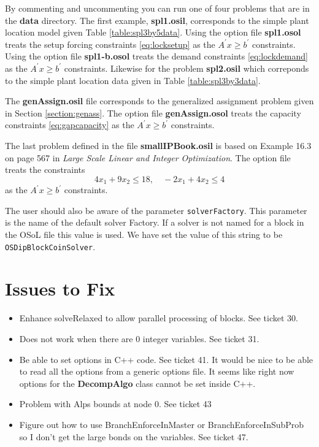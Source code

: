 \documentclass[11pt]{article}
\newcounter{Fig}
\begin{document}
By commenting and uncommenting you can run one of four problems that are in the
{\bf data} directory. The first example, {\bf spl1.osil}, corresponds to the
simple plant location model given Table \ref{table:spl3by5data}. Using the
option file {\bf spl1.osol} treats the setup forcing constraints
\ref{eq:locksetup} as the $A^{\prime} x \ge b^{\prime}$ constraints. Using the
option file {\bf spl1-b.osol} treats the demand constraints
\ref{eq:lockdemand} as the $A^{\prime} x \ge b^{\prime}$ constraints. Likewise
for the problem {\bf spl2.osil} which correponds to the simple plant location
data given in Table \ref{table:spl3by3data}.

The {\bf genAssign.osil} file corresponds to the generalized assignment problem
given in Section \ref{section:genass}.  The option file {\bf genAssign.osol} 
treats the capacity constraints \ref{eq:gapcapacity} as the $A^{\prime} x \ge
b^{\prime}$ constraints. 

The last problem defined in the file {\bf smallIPBook.osil} is based on Example
16.3 on page 567 in {\it Large Scale Linear and Integer Optimization}.  The
option file treats the constraints
$$
4x_{1} + 9 x_{2} \le 18, \quad -2x_{1} + 4 x_{2} \le 4
$$
as the $A^{\prime} x \ge b^{\prime}$ constraints.

The user should also be aware of the parameter {\tt solverFactory}. This
parameter is the name of the default solver Factory. If a solver is not named
for a block in the OSoL file this value is used. We have set the value of this
string to be {\tt OSDipBlockCoinSolver}.


   


\section{Issues to Fix}

\begin{itemize}
  \item Enhance solveRelaxed to allow parallel processing of blocks. See ticket
  30.
  \item Does not work when there are 0 integer variables. See ticket 31.
  
  \item Be able to set options in C++ code. See ticket 41.  It would be nice to
  be able to read all the options from a generic options file. It seems like
  right now options for the {\bf DecompAlgo } class cannot be set inside C++.
  
  \item Problem with Alps  bounds at node 0. See ticket 43
  
  \item Figure out how to use BranchEnforceInMaster or BranchEnforceInSubProb so
  I don't get the large bonds on the variables. See ticket 47.
\end{itemize}




 
\end{document}
